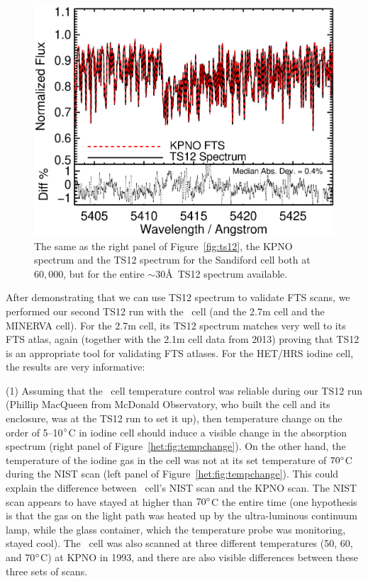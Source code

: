 \begin{figure}[!th]
\centering
\includegraphics[angle=0.,scale=0.45]{het/all_60k_gaus_sclrem_diff.eps}
\caption{The same as the right panel of Figure~\ref{fig:ts12}, the
KPNO spectrum and the TS12 spectrum for the Sandiford cell both at
$60,000$, but for the entire $\sim$30\AA\ TS12 spectrum available. 
  \label{fig:60k_all}}
\end{figure}


After demonstrating that we can use TS12 spectrum to validate FTS
scans, we performed our second TS12 run with the \het\ cell (and the
2.7m cell and the MINERVA cell). For
the 2.7m cell, its TS12 spectrum matches very well to its FTS atlas,
again (together with the 2.1m cell data from 2013) proving that TS12
is an appropriate tool for validating FTS atlases. For the HET/HRS
iodine cell, the results are very informative:

(1) Assuming that the \het\ cell temperature control was reliable
during our TS12 run (Phillip MacQueen from McDonald Observatory, who
built the cell and its enclosure, was at the TS12 run to set it up),
then temperature change on the order of 5--10$^{\circ}$C in iodine cell
should induce a visible change in the absorption spectrum (right panel
of Figure~\ref{het:fig:tempchange}). On the other hand, the
temperature of the iodine gas in the cell was not at its set
temperature of $70^{\circ}$C during the NIST scan (left panel of
Figure~\ref{het:fig:tempchange}). This could explain the difference
between \het\ cell's NIST scan and the KPNO scan. The NIST scan
appears to have stayed at higher than $70^{\circ}$C the entire time
(one hypothesis is that the gas on the light path was heated up by the
ultra-luminous continuum lamp, while the glass container, which the
temperature probe was monitoring, stayed cool). The \keck\ cell was
also scanned at three different temperatures (50, 60, and
70$^{\circ}$C) at KPNO in 1993, and there are also visible differences
between these three sets of scans.


